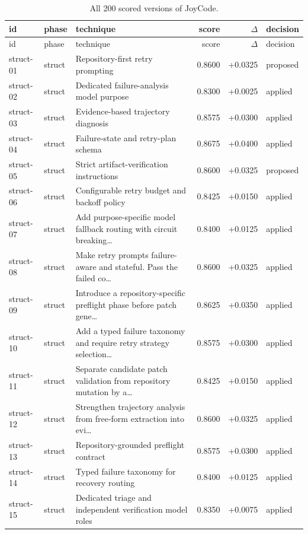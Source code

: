 \begin{center}\scriptsize\begin{longtable}{llp{5.2cm}rrl}
\caption{All 200 scored versions of JoyCode.}\\
\toprule id & phase & technique & score & $\Delta$ & decision \\ \midrule \endfirsthead
\toprule id & phase & technique & score & $\Delta$ & decision \\ \midrule \endhead
struct-01 & struct & Repository-first retry prompting & 0.8600 & +0.0325 & proposed \\
struct-02 & struct & Dedicated failure-analysis model purpose & 0.8300 & +0.0025 & applied \\
struct-03 & struct & Evidence-based trajectory diagnosis & 0.8575 & +0.0300 & applied \\
struct-04 & struct & Failure-state and retry-plan schema & 0.8675 & +0.0400 & applied \\
struct-05 & struct & Strict artifact-verification instructions & 0.8600 & +0.0325 & proposed \\
struct-06 & struct & Configurable retry budget and backoff policy & 0.8425 & +0.0150 & applied \\
struct-07 & struct & Add purpose-specific model fallback routing with circuit breaking\ldots{} & 0.8400 & +0.0125 & applied \\
struct-08 & struct & Make retry prompts failure-aware and stateful. Pass the failed co\ldots{} & 0.8600 & +0.0325 & applied \\
struct-09 & struct & Introduce a repository-specific preflight phase before patch gene\ldots{} & 0.8625 & +0.0350 & applied \\
struct-10 & struct & Add a typed failure taxonomy and require retry strategy selection\ldots{} & 0.8575 & +0.0300 & applied \\
struct-11 & struct & Separate candidate patch validation from repository mutation by a\ldots{} & 0.8425 & +0.0150 & applied \\
struct-12 & struct & Strengthen trajectory analysis from free-form extraction into evi\ldots{} & 0.8600 & +0.0325 & applied \\
struct-13 & struct & Repository-grounded preflight contract & 0.8575 & +0.0300 & applied \\
struct-14 & struct & Typed failure taxonomy for recovery routing & 0.8400 & +0.0125 & applied \\
struct-15 & struct & Dedicated triage and independent verification model roles & 0.8350 & +0.0075 & applied \\

\end{longtable}
\end{center}
